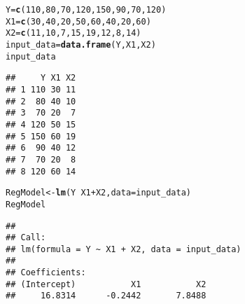 \documentclass{article}\usepackage[]{graphicx}\usepackage[]{xcolor}
\makeatletter
\newcommand{\hlnum}[1]{\textcolor[rgb]{0.686,0.059,0.569}{#1}}%
\newcommand{\hlopt}[1]{\textcolor[rgb]{0,0,0}{#1}}%
\newcommand{\hldef}[1]{\textcolor[rgb]{0.345,0.345,0.345}{#1}}%
\newcommand{\hlkwb}[1]{\textcolor[rgb]{0.69,0.353,0.396}{#1}}%
\newcommand{\hlkwc}[1]{\textcolor[rgb]{0.333,0.667,0.333}{#1}}%
\newcommand{\hlkwd}[1]{\textcolor[rgb]{0.737,0.353,0.396}{\textbf{#1}}}%
\newenvironment{kframe}{%
 \def\at@end@of@kframe{}%
 \ifinner\ifhmode%
  \def\at@end@of@kframe{\end{minipage}}%
  \begin{minipage}{\columnwidth}%
 \fi\fi%
 \def\FrameCommand##1{\hskip\@totalleftmargin \hskip-\fboxsep
 \colorbox{shadecolor}{##1}\hskip-\fboxsep
     \hskip-\linewidth \hskip-\@totalleftmargin \hskip\columnwidth}%
 \MakeFramed {\advance\hsize-\width
   \@totalleftmargin\z@ \linewidth\hsize
   \@setminipage}}%
 {\par\unskip\endMakeFramed%
 \at@end@of@kframe}
\newenvironment{knitrout}{}{} %
\makeatother
\begin{document}
\begin{knitrout}
\color{fgcolor}\begin{kframe}
\begin{alltt}
\hldef{Y}\hlkwb{=}\hlkwd{c}\hldef{(}\hlnum{110}\hldef{,}\hlnum{80}\hldef{,}\hlnum{70}\hldef{,}\hlnum{120}\hldef{,}\hlnum{150}\hldef{,}\hlnum{90}\hldef{,}\hlnum{70}\hldef{,}\hlnum{120}\hldef{)}
\hldef{X1}\hlkwb{=}\hlkwd{c}\hldef{(}\hlnum{30}\hldef{,}\hlnum{40}\hldef{,}\hlnum{20}\hldef{,}\hlnum{50}\hldef{,}\hlnum{60}\hldef{,}\hlnum{40}\hldef{,}\hlnum{20}\hldef{,}\hlnum{60}\hldef{)}
\hldef{X2}\hlkwb{=}\hlkwd{c}\hldef{(}\hlnum{11}\hldef{,}\hlnum{10}\hldef{,}\hlnum{7}\hldef{,}\hlnum{15}\hldef{,}\hlnum{19}\hldef{,}\hlnum{12}\hldef{,}\hlnum{8}\hldef{,}\hlnum{14}\hldef{)}
\hldef{input_data}\hlkwb{=}\hlkwd{data.frame}\hldef{(Y,X1,X2)}
\hldef{input_data}
\end{alltt}
\begin{verbatim}
##     Y X1 X2
## 1 110 30 11
## 2  80 40 10
## 3  70 20  7
## 4 120 50 15
## 5 150 60 19
## 6  90 40 12
## 7  70 20  8
## 8 120 60 14
\end{verbatim}
\end{kframe}
\end{knitrout}
\begin{knitrout}
\color{fgcolor}\begin{kframe}
\begin{alltt}
\hldef{RegModel} \hlkwb{<-} \hlkwd{lm}\hldef{(Y}\hlopt{~}\hldef{X1}\hlopt{+}\hldef{X2,} \hlkwc{data}\hldef{=input_data)}
\hldef{RegModel}
\end{alltt}
\begin{verbatim}
## 
## Call:
## lm(formula = Y ~ X1 + X2, data = input_data)
## 
## Coefficients:
## (Intercept)           X1           X2  
##     16.8314      -0.2442       7.8488
\end{verbatim}
\end{kframe}
\end{knitrout}
	  
\end{document}
